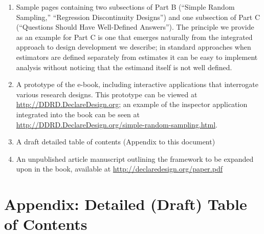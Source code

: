\documentclass[11pt]{article}
\begin{document}
\begin{enumerate}
\item Sample pages containing two subsections of Part B (``Simple Random Sampling,'' ``Regression Discontinuity Designs'') and one subsection of Part C (``Questions Should Have Well-Defined Answers'').  The principle we provide as an example for Part C is one that emerges naturally from the integrated approach to design development we describe; in standard approaches when estimators are defined separately from estimates it can be easy to implement analysis without noticing that the estimand itself is not well defined.  
\item A prototype of the e-book, including interactive applications that interrogate various research designs. This prototype can be viewed at \url{http://DDRD.DeclareDesign.org}; an example of the inspector application integrated into the book can be seen at \url{http://DDRD.DeclareDesign.org/simple-random-sampling.html}.
\item A draft detailed table of contents (Appendix to this document)
\item An unpublished article manuscript outlining the framework to be expanded upon in the book, available at \url{http://declaredesign.org/paper.pdf}
\end{enumerate}	

\section{Appendix: Detailed (Draft) Table of Contents \label{app:toc}}
\end{document}
